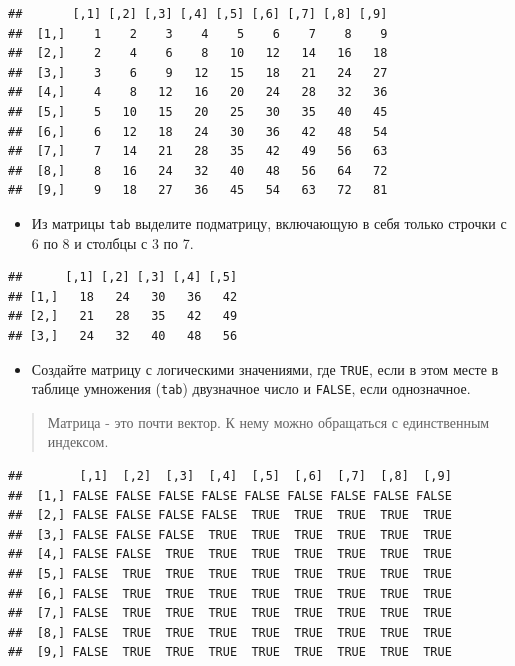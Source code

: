 \documentclass[]{book}
\providecommand{\tightlist}{%
  \setlength{\itemsep}{0pt}\setlength{\parskip}{0pt}}
\begin{document}
\begin{verbatim}
##       [,1] [,2] [,3] [,4] [,5] [,6] [,7] [,8] [,9]
##  [1,]    1    2    3    4    5    6    7    8    9
##  [2,]    2    4    6    8   10   12   14   16   18
##  [3,]    3    6    9   12   15   18   21   24   27
##  [4,]    4    8   12   16   20   24   28   32   36
##  [5,]    5   10   15   20   25   30   35   40   45
##  [6,]    6   12   18   24   30   36   42   48   54
##  [7,]    7   14   21   28   35   42   49   56   63
##  [8,]    8   16   24   32   40   48   56   64   72
##  [9,]    9   18   27   36   45   54   63   72   81
\end{verbatim}

\begin{itemize}
\tightlist
\item
  Из матрицы \texttt{tab} выделите подматрицу, включающую в себя только
  строчки с 6 по 8 и столбцы с 3 по 7.
\end{itemize}

\begin{verbatim}
##      [,1] [,2] [,3] [,4] [,5]
## [1,]   18   24   30   36   42
## [2,]   21   28   35   42   49
## [3,]   24   32   40   48   56
\end{verbatim}

\begin{itemize}
\tightlist
\item
  Создайте матрицу с логическими значениями, где \texttt{TRUE}, если в
  этом месте в таблице умножения (\texttt{tab}) двузначное число и
  \texttt{FALSE}, если однозначное.
\end{itemize}

\begin{quote}
Матрица - это почти вектор. К нему можно обращаться с единственным
индексом.
\end{quote}

\begin{verbatim}
##        [,1]  [,2]  [,3]  [,4]  [,5]  [,6]  [,7]  [,8]  [,9]
##  [1,] FALSE FALSE FALSE FALSE FALSE FALSE FALSE FALSE FALSE
##  [2,] FALSE FALSE FALSE FALSE  TRUE  TRUE  TRUE  TRUE  TRUE
##  [3,] FALSE FALSE FALSE  TRUE  TRUE  TRUE  TRUE  TRUE  TRUE
##  [4,] FALSE FALSE  TRUE  TRUE  TRUE  TRUE  TRUE  TRUE  TRUE
##  [5,] FALSE  TRUE  TRUE  TRUE  TRUE  TRUE  TRUE  TRUE  TRUE
##  [6,] FALSE  TRUE  TRUE  TRUE  TRUE  TRUE  TRUE  TRUE  TRUE
##  [7,] FALSE  TRUE  TRUE  TRUE  TRUE  TRUE  TRUE  TRUE  TRUE
##  [8,] FALSE  TRUE  TRUE  TRUE  TRUE  TRUE  TRUE  TRUE  TRUE
##  [9,] FALSE  TRUE  TRUE  TRUE  TRUE  TRUE  TRUE  TRUE  TRUE
\end{verbatim}
\end{document}
